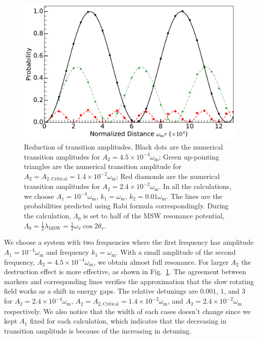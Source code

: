 \documentclass[%
reprint,
 amsmath,amssymb,
 aps,
]{revtex4-1}
\begin{document}
\begin{figure}
                \centering
                \includegraphics[width=\columnwidth]{assets/interference-reduction}
                \caption{Reduction of transition amplitudes. Black dots are the numerical transition amplitudes for $A_2=4.5\times 10^{-4}\omega_{\mathrm m}$; Green up-pointing triangles are the numerical transition amplitude for $A_2=A_{2,\mathrm{Critical}}=1.4\times10^{-2}\omega_{\mathrm m}$; Red diamonds are the numerical transition amplitudes for $A_2=2.4\times10^{-2}\omega_{\mathrm m}$. In all the calculations, we choose $A_1=10^{-4}\omega_{\mathrm m}$, $k_1=\omega_{\mathrm m}$, $k_2=0.01\omega_{\mathrm m}$. The lines are the probabilities predicted using Rabi formula correspondingly. During the calculation, $\Lambda_0$ is set to half of the MSW resonance potential, $\Lambda_0 = \frac{1}{2}\lambda_{\mathrm{MSW}}=\frac{1}{2}\omega_{\mathrm{v}}\cos 2\theta_{\mathrm v}$.}
                \label{fig-rabi-oscillations-energy-gap-change}
\end{figure}


We choose a system with two frequencies where the first frequency has amplitude $A_1 = 10^{-4}\omega_{\mathrm{m}}$ and frequency $k_1 = \omega_{\mathrm{m}}$. With a small amplitude of the second frequency, $A_2=4.5\times10^{-4}\omega_{\mathrm{m}}$, we obtain almost full resonance. For larger $A_2$ the destruction effect is more effective, as shown in Fig.~\ref{fig-rabi-oscillations-energy-gap-change}. The agreement between markers and corresponding lines verifies the approximation that the slow rotating field works as a shift in energy gaps. The relative detunings are $0.001$, $1$, and $3$ for $A_2= 2.4\times10^{-4}\omega_{\mathrm{m}}$, $A_2=A_{2,\text{Critical}}=1.4\times10^{-2}\omega_{\mathrm{m}}$, and $A_2= 2.4\times10^{-2} \omega_{\mathrm{m}}$ respectively. We also notice that the width of each cases doesn't change since we kept $A_1$ fixed for each calculation, which indicates that the decreasing in transition amplitude is because of the increasing in detuning.
\end{document}
